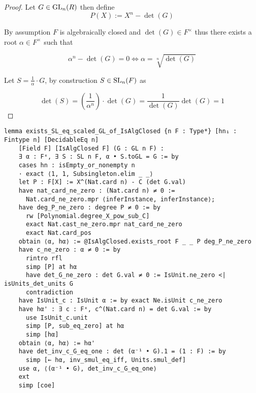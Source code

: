 \begin{proof}
\leanok
Let $G \in \operatorname{GL}_n(R)$ then define
\begin{equation*}
    P(X) := X^n - \det(G)
\end{equation*}

By assumption $F$ is algebraically closed and $\det(G) \in F^\times$ thus there exists a root $\alpha \in F^\times$ such that 

\begin{equation*}
    \alpha^n - \det(G) = 0 \iff \alpha = \sqrt[n]{\det(G)} 
\end{equation*}

Let $S = \frac{1}{\alpha} \cdot G$, by construction $S \in \operatorname{SL}_n(F)$ as 

\begin{equation*}
    \det(S) = \left(\frac{1}{\alpha^n}\right) \cdot \det(G) = \frac{1}{\det(G)} \det(G) = 1
\end{equation*}
\end{proof}
\begin{footnotesize}
\begin{verbatim}
lemma exists_SL_eq_scaled_GL_of_IsAlgClosed {n F : Type*} [hn₁ : Fintype n] [DecidableEq n]
    [Field F] [IsAlgClosed F] (G : GL n F) :
    ∃ α : Fˣ, ∃ S : SL n F, α • S.toGL = G := by
    cases hn : isEmpty_or_nonempty n
    · exact ⟨1, 1, Subsingleton.elim _ _⟩
    let P : F[X] := X^(Nat.card n) - C (det G.val)
    have nat_card_ne_zero : (Nat.card n) ≠ 0 :=
      Nat.card_ne_zero.mpr ⟨inferInstance, inferInstance⟩;
    have deg_P_ne_zero : degree P ≠ 0 := by
      rw [Polynomial.degree_X_pow_sub_C]
      exact Nat.cast_ne_zero.mpr nat_card_ne_zero
      exact Nat.card_pos
    obtain ⟨α, hα⟩ := @IsAlgClosed.exists_root F _ _ P deg_P_ne_zero
    have c_ne_zero : α ≠ 0 := by
      rintro rfl
      simp [P] at hα
      have det_G_ne_zero : det G.val ≠ 0 := IsUnit.ne_zero <| isUnits_det_units G
      contradiction
    have IsUnit_c : IsUnit α := by exact Ne.isUnit c_ne_zero
    have hα' : ∃ c : Fˣ, c^(Nat.card n) = det G.val := by
      use IsUnit_c.unit
      simp [P, sub_eq_zero] at hα
      simp [hα]
    obtain ⟨α, hα⟩ := hα'
    have det_inv_c_G_eq_one : det (α⁻¹ • G).1 = (1 : F) := by
      simp [← hα, inv_smul_eq_iff, Units.smul_def]
    use α, ⟨(α⁻¹ • G), det_inv_c_G_eq_one⟩
    ext
    simp [coe]
\end{verbatim}
\end{footnotesize}


